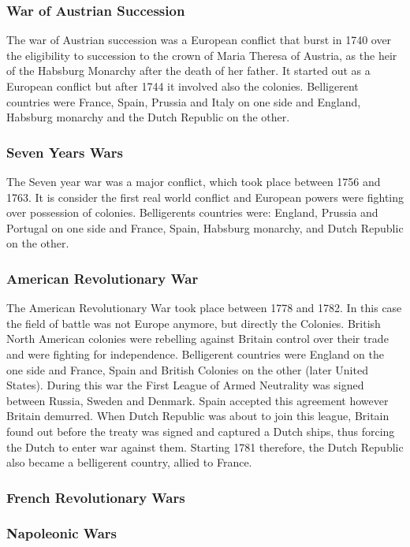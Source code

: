 \documentclass[12pt,a4paper,titlepage]{article}
\begin{document}
\subsubsection{War of Austrian Succession}
The war of Austrian succession was a European conflict that burst in 1740 over the eligibility to succession to the crown of Maria Theresa of Austria, as the heir of the Habsburg Monarchy after the death of her father. It started out as a European conflict but after 1744 it involved also the colonies. Belligerent countries were France, Spain, Prussia and Italy on one side and England, Habsburg monarchy and the Dutch Republic on the other. 

\subsubsection{Seven Years Wars}
The Seven year war was a major conflict, which took place between 1756 and 1763. It is consider the first real world conflict and European powers were fighting over possession of colonies. Belligerents countries were: England, Prussia and Portugal on one side and France, Spain, Habsburg monarchy, and Dutch Republic on the other. 

\subsubsection{American Revolutionary War}
The American Revolutionary War took place between 1778 and 1782. In this case the field of battle was not Europe anymore, but directly the Colonies. British North American colonies were rebelling against Britain control over their trade and were fighting for independence. Belligerent countries were England on the one side and France, Spain and British Colonies on the other (later United States). During this war the First League of Armed Neutrality was signed between Russia, Sweden and Denmark. Spain accepted this agreement however Britain demurred. When Dutch Republic was about to join this league, Britain found out before the treaty was signed and captured a Dutch ships, thus forcing the Dutch to enter war against them. Starting 1781 therefore, the Dutch Republic also became a belligerent country, allied to France. 

\subsubsection{French Revolutionary Wars}


\subsubsection{Napoleonic Wars}
\end{document}
